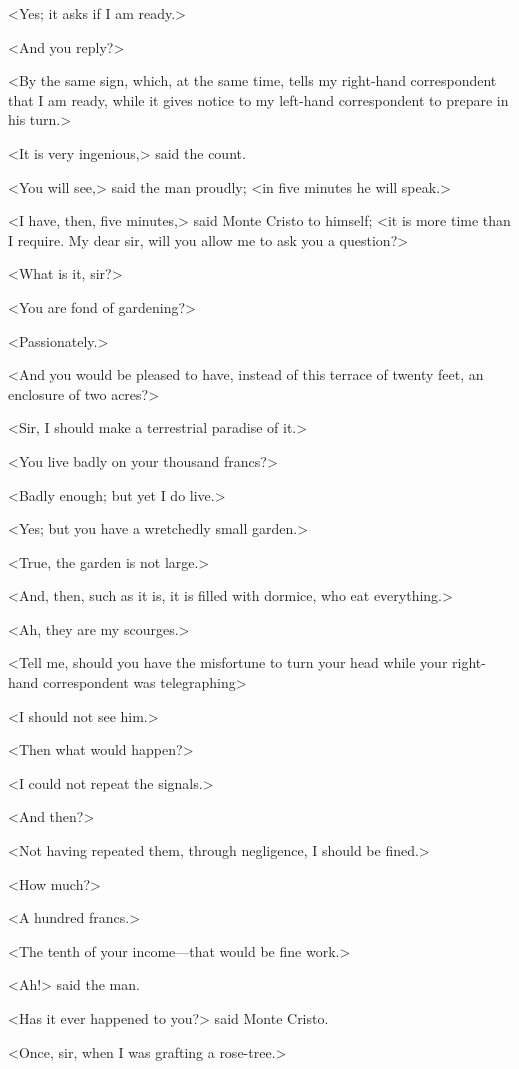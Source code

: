  <Yes; it asks if I am ready.> 

 <And you reply?> 

 <By the same sign, which, at the same time, tells my right-hand correspondent that I am ready, while it gives notice to my left-hand correspondent to prepare in his turn.> 

 <It is very ingenious,> said the count. 

 <You will see,> said the man proudly; <in five minutes he will speak.> 

 <I have, then, five minutes,> said Monte Cristo to himself; <it is more time than I require. My dear sir, will you allow me to ask you a question?> 

 <What is it, sir?> 

 <You are fond of gardening?> 

 <Passionately.> 

 <And you would be pleased to have, instead of this terrace of twenty feet, an enclosure of two acres?> 

 <Sir, I should make a terrestrial paradise of it.> 

 <You live badly on your thousand francs?> 

 <Badly enough; but yet I do live.> 

 <Yes; but you have a wretchedly small garden.> 

 <True, the garden is not large.> 

 <And, then, such as it is, it is filled with dormice, who eat everything.> 

 <Ah, they are my scourges.> 

 <Tell me, should you have the misfortune to turn your head while your right-hand correspondent was telegraphing\longdash> 

 <I should not see him.> 

 <Then what would happen?> 

 <I could not repeat the signals.> 

 <And then?> 

 <Not having repeated them, through negligence, I should be fined.> 

 <How much?> 

 <A hundred francs.> 

 <The tenth of your income—that would be fine work.> 

 <Ah!> said the man. 

 <Has it ever happened to you?> said Monte Cristo. 

 <Once, sir, when I was grafting a rose-tree.> 

